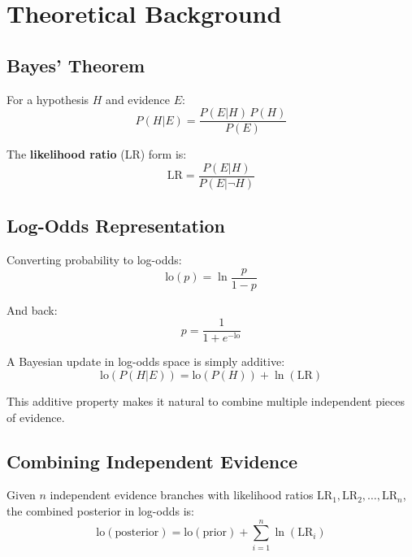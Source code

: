 \documentclass[11pt,a4paper]{article}
\begin{document}
\section{Theoretical Background}

\subsection{Bayes' Theorem}

For a hypothesis $H$ and evidence $E$:
\begin{equation}
P(H|E) = \frac{P(E|H)\,P(H)}{P(E)}
\end{equation}

The \textbf{likelihood ratio} (LR) form is:
\begin{equation}
\text{LR} = \frac{P(E|H)}{P(E|\neg H)}
\end{equation}

\subsection{Log-Odds Representation}

Converting probability to log-odds:
\begin{equation}
\text{lo}(p) = \ln\frac{p}{1-p}
\end{equation}

And back:
\begin{equation}
p = \frac{1}{1 + e^{-\text{lo}}}
\end{equation}

A Bayesian update in log-odds space is simply additive:
\begin{equation}
\text{lo}(P(H|E)) = \text{lo}(P(H)) + \ln(\text{LR})
\end{equation}

This additive property makes it natural to combine multiple independent pieces
of evidence.

\subsection{Combining Independent Evidence}

Given $n$ independent evidence branches with likelihood ratios
$\text{LR}_1, \text{LR}_2, \ldots, \text{LR}_n$, the combined posterior
in log-odds is:
\begin{equation}
\text{lo}(\text{posterior}) = \text{lo}(\text{prior}) + \sum_{i=1}^{n} \ln(\text{LR}_i)
\end{equation}
\end{document}
